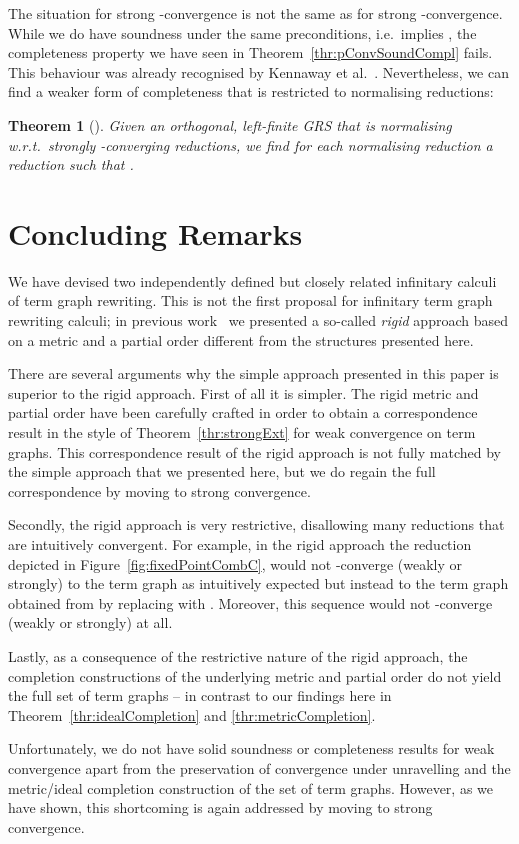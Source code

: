 \documentclass[copyright,creativecommons,UKenglish,final]{eptcs}
\theoremstyle{definition}
\theoremstyle{plain}
\newtheorem{theorem}{Theorem}[section]
\begin{document}
The situation for strong -convergence is not the same as for
strong -convergence. While we do have soundness under the same
preconditions, i.e.\  implies , the completeness property we have
seen in Theorem~\ref{thr:pConvSoundCompl} fails. This behaviour was
already recognised by Kennaway et
al.~\cite{kennaway94toplas}. Nevertheless, we can find a weaker form
of completeness that is restricted to normalising reductions:
\begin{theorem}[\cite{bahr12rta}]
  Given an orthogonal, left-finite GRS  that is normalising
  w.r.t.\ strongly -converging reductions, we find for each
  normalising reduction  a reduction
   such that .
\end{theorem}


\section{Concluding Remarks}
\label{sec:concluding-remarks}


We have devised two independently defined but closely related
infinitary calculi of term graph rewriting. This is not the first
proposal for infinitary term graph rewriting calculi; in previous
work~\cite{bahr12lmcs} we presented a so-called \emph{rigid} approach
based on a metric and a partial order different from the structures
presented here.

There are several arguments why the simple approach presented in this
paper is superior to the rigid approach. First of all it is
simpler. The rigid metric and partial order have been carefully
crafted in order to obtain a correspondence result in the style of
Theorem~\ref{thr:strongExt} for weak convergence on term graphs. This
correspondence result of the rigid approach is not fully matched by
the simple approach that we presented here, but we do regain the full
correspondence by moving to strong convergence.

Secondly, the rigid approach is very restrictive, disallowing many
reductions that are intuitively convergent. For example, in the rigid
approach the reduction depicted in Figure~\ref{fig:fixedPointCombC},
would not -converge (weakly or strongly) to the term graph
 as intuitively expected but instead to the term graph
obtained from  by replacing  with . Moreover, this
sequence would not -converge (weakly or strongly) at all.

Lastly, as a consequence of the restrictive nature of the rigid
approach, the completion constructions of the underlying metric and
partial order do not yield the full set of term graphs -- in contrast
to our findings here in Theorem~\ref{thr:idealCompletion} and
\ref{thr:metricCompletion}.

Unfortunately, we do not have solid soundness or completeness results
for weak convergence apart from the preservation of convergence under
unravelling and the metric/ideal completion construction of the set of
term graphs. However, as we have shown, this shortcoming is again
addressed by moving to strong convergence.


\end{document}
